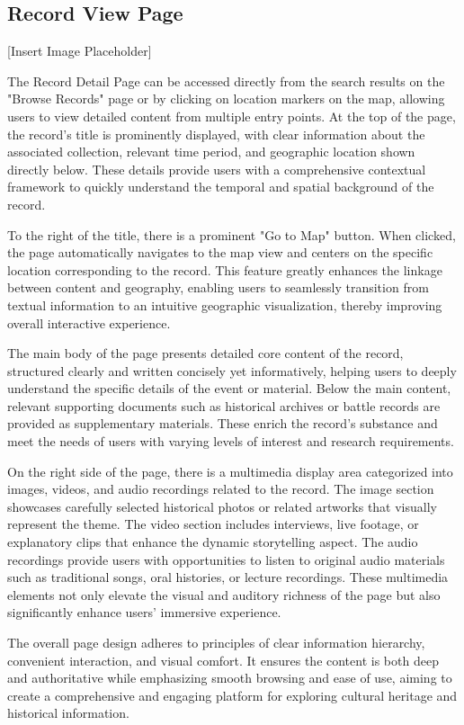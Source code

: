 \subsection{Record View Page}
[Insert Image Placeholder]

The Record Detail Page can be accessed directly from the search results on the "Browse Records" page or by clicking on location markers on the map, allowing users to view detailed content from multiple entry points. At the top of the page, the record's title is prominently displayed, with clear information about the associated collection, relevant time period, and geographic location shown directly below. These details provide users with a comprehensive contextual framework to quickly understand the temporal and spatial background of the record.

To the right of the title, there is a prominent "Go to Map" button. When clicked, the page automatically navigates to the map view and centers on the specific location corresponding to the record. This feature greatly enhances the linkage between content and geography, enabling users to seamlessly transition from textual information to an intuitive geographic visualization, thereby improving overall interactive experience.

The main body of the page presents detailed core content of the record, structured clearly and written concisely yet informatively, helping users to deeply understand the specific details of the event or material. Below the main content, relevant supporting documents such as historical archives or battle records are provided as supplementary materials. These enrich the record's substance and meet the needs of users with varying levels of interest and research requirements.

On the right side of the page, there is a multimedia display area categorized into images, videos, and audio recordings related to the record. The image section showcases carefully selected historical photos or related artworks that visually represent the theme. The video section includes interviews, live footage, or explanatory clips that enhance the dynamic storytelling aspect. The audio recordings provide users with opportunities to listen to original audio materials such as traditional songs, oral histories, or lecture recordings. These multimedia elements not only elevate the visual and auditory richness of the page but also significantly enhance users' immersive experience.

The overall page design adheres to principles of clear information hierarchy, convenient interaction, and visual comfort. It ensures the content is both deep and authoritative while emphasizing smooth browsing and ease of use, aiming to create a comprehensive and engaging platform for exploring cultural heritage and historical information.

